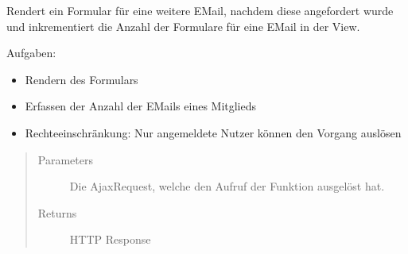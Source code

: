 \documentclass[letterpaper,10pt,english]{sphinxmanual}
\begin{document}

\begin{fulllineitems}
\label{\detokenize{masterCodeDoc:mitglieder.views.email_html_laden}}
Rendert ein Formular für eine weitere E\sphinxhyphen{}Mail, nachdem diese angefordert wurde und inkrementiert die Anzahl der Formulare für eine E\sphinxhyphen{}Mail in der View.

Aufgaben:
\begin{itemize}
\item {} 
Rendern des Formulars

\item {} 
Erfassen der Anzahl der E\sphinxhyphen{}Mails eines Mitglieds

\item {} 
Rechteeinschränkung: Nur angemeldete Nutzer können den Vorgang auslösen

\end{itemize}
\begin{quote}\begin{description}
\item[{Parameters}] \leavevmode
{} \textendash{} Die Ajax\sphinxhyphen{}Request, welche den Aufruf der Funktion ausgelöst hat.

\item[{Returns}] \leavevmode
HTTP Response

\end{description}\end{quote}

\end{fulllineitems}

\end{document}
